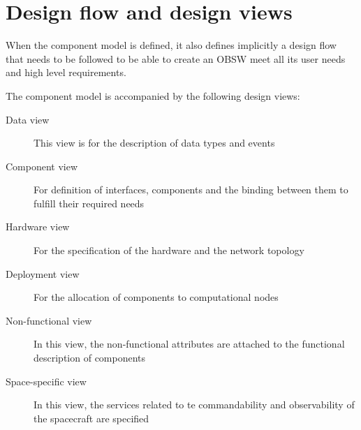 \section{Design flow and design views}
When the component model is defined, it also defines implicitly a design flow that needs to be followed to be able to create an OBSW meet all its user needs and high level requirements. 

The component model is accompanied by the following design views:
\begin{description}
\item [Data view] This view is for the description of data types and events
\item [Component view] For definition of interfaces, components and the binding between them to fulfill their required needs
\item [Hardware view] For the specification of the hardware and the network topology
\item [Deployment view] For the allocation of components to computational nodes
\item [Non-functional view] In this view, the non-functional attributes are attached to the functional description of components
\item [Space-specific view] In this view, the services related to te commandability and observability of the spacecraft are specified
\end{description}        

  